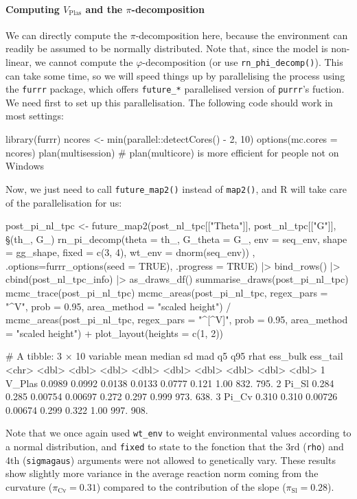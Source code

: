 \documentclass[a4paper,12pt,twoside]{article}
\begin{document}
\paragraph{Computing $V_{\text{Plas}}$ and the $\pi$-decomposition}
We can directly compute the $\pi$-decomposition here, because the environment can readily be assumed to be normally distributed. Note that, since the model is non-linear, we cannot compute the $\varphi$-decomposition (or use \texttt{rn\_phi\_decomp()}).
This can take some time, so we will speed things up by parallelising the process using the \texttt{furrr} package, which offers \texttt{future\_*} parallelised version of \texttt{purrr}'s fuction.
We need first to set up this parallelisation. The following code should work in most settings:
\begin{Rinput}
library(furrr)
ncores <- min(parallel::detectCores() - 2, 10)
options(mc.cores = ncores)
plan(multisession)  # plan(multicore) is more efficient for people not on Windows
\end{Rinput}
Now, we just need to call \texttt{future\_map2()} instead of \texttt{map2()}, and R will take care of the parallelisation for us:
\begin{Rinput}
post_pi_nl_tpc <-
    future_map2(post_nl_tpc[["Theta"]], post_nl_tpc[["G"]],
                \§§(th_, G_) { rn_pi_decomp(theta    = th_,
                                          G_theta  = G_,
                                          env      = seq_env,
                                          shape    = gg_shape,
                                          fixed    = c(3, 4),
                                          wt_env   = dnorm(seq_env)) },
                .options=furrr_options(seed = TRUE),
                .progress = TRUE) |>
    bind_rows() |>
    cbind(post_nl_tpc_info) |>
    as_draws_df()
summarise_draws(post_pi_nl_tpc)
mcmc_trace(post_pi_nl_tpc)
mcmc_areas(post_pi_nl_tpc,
           regex_pars = "^V",
           prob = 0.95,
           area_method = "scaled height") /
    mcmc_areas(post_pi_nl_tpc,
               regex_pars = "^[^V]",
               prob = 0.95,
               area_method = "scaled height") +
    plot_layout(heights = c(1, 2))
\end{Rinput}
\begin{Routput}
# A tibble: 3 × 10
  variable   mean median      sd     mad     q5   q95  rhat ess_bulk ess_tail
  <chr>     <dbl>  <dbl>   <dbl>   <dbl>  <dbl> <dbl> <dbl>    <dbl>    <dbl>
1 V_Plas   0.0989 0.0992 0.0138  0.0133  0.0777 0.121 1.00      832.     795.
2 Pi_Sl    0.284  0.285  0.00754 0.00697 0.272  0.297 0.999     973.     638.
3 Pi_Cv    0.310  0.310  0.00726 0.00674 0.299  0.322 1.00      997.     908.
\end{Routput}
Note that we once again used \texttt{wt\_env} to weight environmental values according to a normal distribution, and \texttt{fixed} to state to the fonction that the 3rd (\texttt{rho}) and 4th (\texttt{sigmagaus}) arguments were not allowed to genetically vary.
These results show slightly more variance in the average reaction norm coming from the curvature ($\pi_{\text{Cv}}=0.31$) compared to the contribution of the slope ($\pi_{\text{Sl}}=0.28$).
\end{document}

